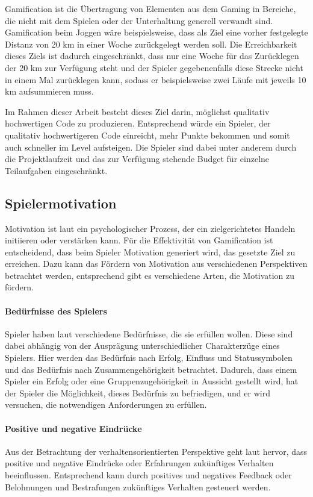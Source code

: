 \documentclass[
	oneside,  %
	ngerman, 
	final, 
	11pt, 
	a4paper, 
	1.1headlines, 
	headinclude=false, 
	footinclude=false, 
	mpinclude=false, 
	pagesize, 
	onecolumn, 
	titlepage, 
	parskip=half, 
	headsepline, 
	chapterprefix=false, 
	version=first, 
	listof=totoc, 
	bibliography=totoc, 
	toc=graduated, 
	fleqn
]{scrbook}
\begin{document}
Gamification ist die Übertragung von Elementen aus dem Gaming in Bereiche, die nicht mit dem Spielen oder der Unterhaltung generell verwandt sind.
Gamification beim Joggen wäre beispielsweise, dass als Ziel eine vorher festgelegte Distanz von 20 km in einer Woche zurückgelegt werden soll.
Die Erreichbarkeit dieses Ziels ist dadurch eingeschränkt, dass nur eine Woche für das Zurücklegen der 20 km zur Verfügung steht und der Spieler gegebenenfalls diese Strecke nicht in einem Mal zurücklegen kann, sodass er beispielsweise zwei Läufe mit jeweils 10 km aufsummieren muss.

Im Rahmen dieser Arbeit besteht dieses Ziel darin, möglichst qualitativ hochwertigen Code zu produzieren.
Entsprechend würde ein Spieler, der qualitativ hochwertigeren Code einreicht, mehr Punkte bekommen und somit auch schneller im Level aufsteigen.
Die Spieler sind dabei unter anderem durch die Projektlaufzeit und das zur Verfügung stehende Budget für einzelne Teilaufgaben eingeschränkt.

\subsection{Spielermotivation}
\label{Spielermotivation}
Motivation ist laut \cite{SH2014} ein psychologischer Prozess, der ein zielgerichtetes Handeln initiieren oder verstärken kann.
Für die Effektivität von Gamification ist entscheidend, dass beim Spieler Motivation generiert wird, das gesetzte Ziel zu erreichen.
Dazu kann das Fördern von Motivation aus verschiedenen Perspektiven betrachtet werden, entsprechend gibt es verschiedene Arten, die Motivation zu fördern.

\paragraph{Bedürfnisse des Spielers}
Spieler haben laut \cite{SH2014} verschiedene Bedürfnisse, die sie erfüllen wollen.
Diese sind dabei abhängig von der Ausprägung unterschiedlicher Charakterzüge eines Spielers.
Hier werden das Bedürfnis nach Erfolg, Einfluss und Statussymbolen und das Bedürfnis nach Zusammengehörigkeit betrachtet.
Dadurch, dass einem Spieler ein Erfolg oder eine Gruppenzugehörigkeit in Aussicht gestellt wird, hat der Spieler die Möglichkeit, dieses Bedürfnis zu befriedigen, und er wird versuchen, die notwendigen Anforderungen zu erfüllen.

\paragraph{Positive und negative Eindrücke}
Aus der Betrachtung der verhaltensorientierten Perspektive geht laut \cite{SH2014} hervor, dass positive und negative Eindrücke oder Erfahrungen zukünftiges Verhalten beeinflussen.
Entsprechend kann durch positives und negatives Feedback oder Belohnungen und Bestrafungen zukünftiges Verhalten gesteuert werden.
\end{document}
